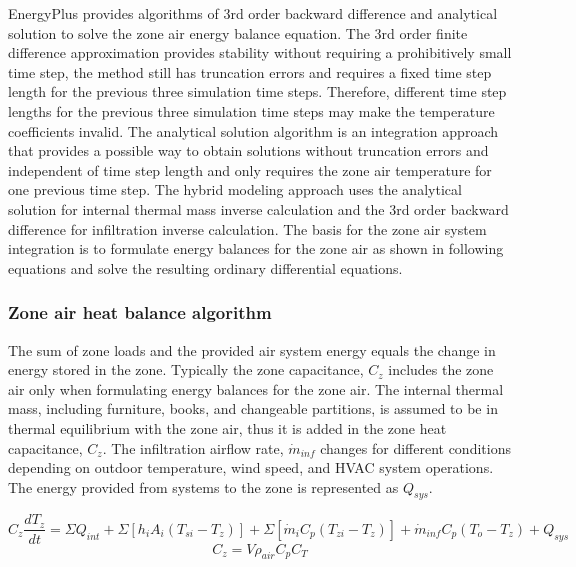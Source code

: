EnergyPlus provides algorithms of 3rd order backward difference and analytical solution to solve the zone air energy balance equation. The 3rd order finite difference approximation provides stability without requiring a prohibitively small time step, the method still has truncation errors and requires a fixed time step length for the previous three simulation time steps. Therefore, different time step lengths for the previous three simulation time steps may make the temperature coefficients invalid. The analytical solution algorithm is an integration approach that provides a possible way to obtain solutions without truncation errors and independent of time step length and only requires the zone air temperature for one previous time step. The hybrid modeling approach uses the analytical solution for internal thermal mass inverse calculation and the 3rd order backward difference for infiltration inverse calculation. The basis for the zone air system integration is to formulate energy balances for the zone air as shown in following equations and solve the resulting ordinary differential equations.

\subsubsection{Zone air heat balance algorithm}\label{Zone-air-heat-balance-algorithm}
The sum of zone loads and the provided air system energy equals the change in energy stored in the zone. Typically the zone capacitance, $C_z$ includes the zone air only when formulating energy balances for the zone air. The internal thermal mass, including furniture, books, and changeable partitions, is assumed to be in thermal equilibrium with the zone air, thus it is added in the zone heat capacitance, $C_z$.  The infiltration airflow rate, $\dot{m}_{inf}$ changes for different conditions depending on outdoor temperature, wind speed, and HVAC system operations. The energy provided from systems to the zone is represented as $Q_{sys}$.

\begin{equation}
C_z \frac {dT_z} {dt} = \Sigma Q_{int} +\Sigma[h_i A_i (T_{si} - T_z)] + \Sigma [\dot{m}_i C_p (T_{zi}-T_z)] + \dot{m}_{inf} C_p (T_o - T_z) + Q_{sys}
\end{equation}
\begin{equation}
C_z = V \rho_{air} C_p C_T
\end{equation}


